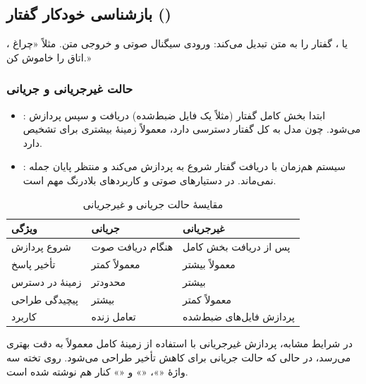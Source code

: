 \subsection{بازشناسی خودکار گفتار ()}
، یا ، گفتار را به متن تبدیل می‌کند: ورودی سیگنال صوتی و خروجی متن. مثلاً «چراغ اتاق را خاموش کن.»

\subsubsection{حالت غیرجریانی و جریانی}
\begin{itemize}
  \item {}: ابتدا بخش کامل گفتار (مثلاً یک فایل ضبط‌شده) دریافت و سپس پردازش می‌شود. چون مدل به کل گفتار دسترسی دارد، معمولاً زمینهٔ بیشتری برای تشخیص دارد.
  \item {}: سیستم هم‌زمان با دریافت گفتار شروع به پردازش می‌کند و منتظر پایان جمله نمی‌ماند. در دستیارهای صوتی و کاربردهای بلادرنگ مهم است.
\end{itemize}

\begin{table}[htbp]
\centering
\caption{مقایسهٔ حالت جریانی و غیرجریانی}
\begin{tabular}{p{3.5cm}p{4.8cm}p{4.8cm}}
\toprule
ویژگی & جریانی & غیرجریانی \\
\midrule
شروع پردازش & هنگام دریافت صوت & پس از دریافت بخش کامل \\
تأخیر پاسخ & معمولاً کمتر & معمولاً بیشتر \\
زمینهٔ در دسترس & محدودتر & بیشتر \\
پیچیدگی طراحی & بیشتر & معمولاً کمتر \\
کاربرد & تعامل زنده & پردازش فایل‌های ضبط‌شده \\
\bottomrule
\end{tabular}
\end{table}

در شرایط مشابه، پردازش غیرجریانی با استفاده از زمینهٔ کامل معمولاً به دقت بهتری می‌رسد، در حالی که حالت جریانی برای کاهش تأخیر طراحی می‌شود. روی تخته سه واژهٔ «»، «» و «» کنار هم نوشته شده است.

